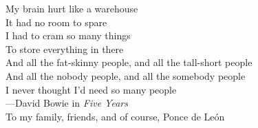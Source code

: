 \documentclass{ucbthesis}
\begin{document}
\begin{frontmatter}

\begin{dedication}
\begin{center}
\vfil\null
My brain hurt like a warehouse\\
It had no room to spare\\
I had to cram so many things\\
To store everything in there\\
And all the fat-skinny people, and all the tall-short people\\
And all the nobody people, and all the somebody people\\
I never thought I'd need so many people\\
\vspace{5 mm}
---David Bowie in \textit{Five Years}\\
\vspace{35 mm}
To my family, friends, and of course, Ponce de Le\'on\\
\end{center}
\end{dedication}

\tableofcontents


\end{frontmatter}
\end{document}
